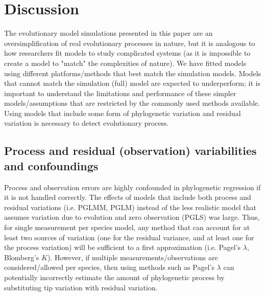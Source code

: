 \documentclass[12pt]{article}
\begin{document}
\newpage

\section{Discussion}



The evolutionary model simulations presented in this paper are an oversimplification of real evolutionary processes in nature, but it is analogous to how researchers fit models to study complicated systems (as it is impossible to create a model to "match" the complexities of nature).
We have fitted models using different platforms/methods that best match the simulation models. 
Models that cannot match the simulation (full) model are expected to underperform; it is important to understand the limitations and performance of these simpler models/assumptions that are restricted by the commonly used methods available.
Using models that include some form of phylogenetic variation and residual variation is necessary to  detect evolutionary process.

\subsection{Process and residual (observation) variabilities and confoundings}

Process and observation errors are highly confounded in phylogenetic regression if it is not handled correctly. 
The effects of models that include both process and residual variations (i.e. PGLMM, PGLM) instead of the less realistic model that assumes variation due to evolution and zero observation (PGLS) was large. 
Thus, for single measurement per species model, any method that can account for at least two sources of variation (one for the residual variance, and at least one for the process variation) will be sufficient to a first approximation (i.e. Pagel's $\lambda$, Blomberg's $K$).
However, if multiple measurements/observations are considered/allowed per species, then using methods such as Pagel's $\lambda$ can potentially incorrectly estimate the amount of phylogenetic process by substituting tip variation with residual variation. 
\end{document}
